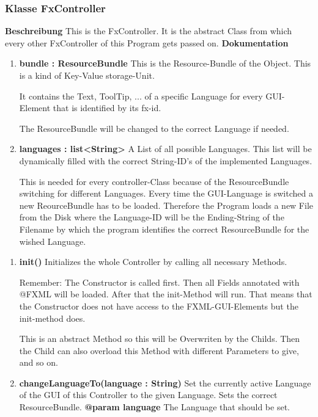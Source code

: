 \documentclass{article}
\newcommand{\myclass}[1]{\subsubsection*{Klasse #1} \label{#1} \addcontentsline{toc}{subsubsection}{\nameref{#1}}}
\begin{document}
			\myclass{FxController}
				\textbf{Beschreibung}
				This is the FxController.
				It is the abstract Class from which every other FxController of this Program gets passed on.
				\textbf{Dokumentation}
				\begin{enumerate}[-]
					\item{
						\textbf{bundle : ResourceBundle} \newline
						This is the Resource-Bundle of the Object.
						This is a kind of Key-Value storage-Unit.
						
						It contains the Text, ToolTip, ... of a specific Language for every GUI-Element that is identified by its fx-id.
						
						The ResourceBundle will be changed to the correct Language if needed.
					}
					\item{
						\textbf{languages : list<String>} \newline
						A List of all possible Languages.
						This list will be dynamically filled with the correct String-ID's of the implemented Languages.
						
						This is needed for every controller-Class because of the ResourceBundle switching for different Languages.
						Every time the GUI-Language is switched a new ReourceBundle has to be loaded.
						Therefore the Program loads a new File from the Disk where the Language-ID will be the Ending-String of the Filename by which the program identifies the correct ResourceBundle for the wished Language.
					}
				\end{enumerate}
				\begin{enumerate}[+]
					\item{
						\textbf{init()} \newline
						Initializes the whole Controller by calling all necessary Methods.
						
						Remember:
						The Constructor is called first.
						Then all Fields annotated with @FXML will be loaded.
						After that the init-Method will run.
						That means that the Constructor does not have access to the FXML-GUI-Elements but the init-method does.
						
						This is an abstract Method so this will be Overwriten by the Childs.
						Then the Child can also overload this Method with different Parameters to give, and so on.
						\newline
					}
					\item{
						\textbf{changeLanguageTo(language : String)} \newline
						Set the currently active Language of the GUI of this Controller to the given Language.
						Sets the correct ResourceBundle.
						\newline
						\textbf{@param language}
							The Language that should be set.
							\newline
					}
				\end{enumerate}
			
\end{document}
